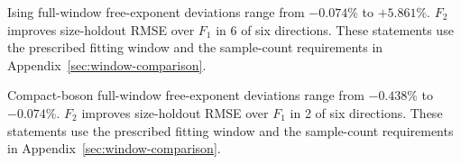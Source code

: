 Ising full-window free-exponent deviations range from $-0.074\%$ to $+5.861\%$. $F_2$ improves size-holdout RMSE over $F_1$ in 6 of six directions. These statements use the prescribed fitting window and the sample-count requirements in Appendix~\ref{sec:window-comparison}.\par
Compact-boson full-window free-exponent deviations range from $-0.438\%$ to $-0.074\%$. $F_2$ improves size-holdout RMSE over $F_1$ in 2 of six directions. These statements use the prescribed fitting window and the sample-count requirements in Appendix~\ref{sec:window-comparison}.\par
